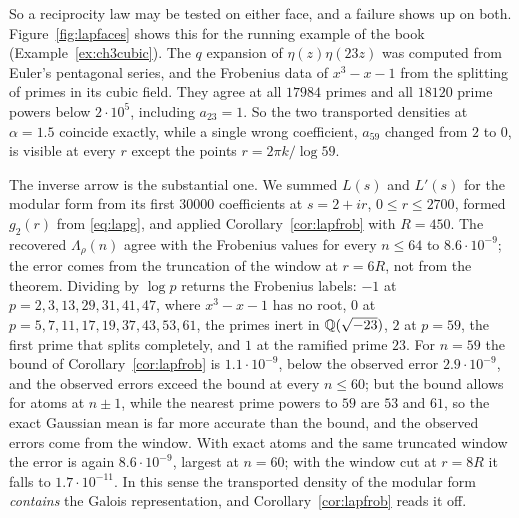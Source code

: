 So a reciprocity law may be tested on either face, and a failure shows up on both. Figure~\ref{fig:lapfaces} shows this for the running example of the book (Example~\ref{ex:ch3cubic}). The $q$ expansion of $\eta(z)\eta(23z)$ was computed from Euler's pentagonal series, and the Frobenius data of $x^3-x-1$ from the splitting of primes in its cubic field. They agree at all $17984$ primes and all $18120$ prime powers below $2\cdot10^5$, including $a_{23}=1$. So the two transported densities at $\alpha=1.5$ coincide exactly, while a single wrong coefficient, $a_{59}$ changed from $2$ to $0$, is visible at every $r$ except the points $r=2\pi k/\log59$.

The inverse arrow is the substantial one. We summed $L(s)$ and $L'(s)$ for the modular form from its first $30000$ coefficients at $s=2+ir$, $0\le r\le2700$, formed $g_2(r)$ from \eqref{eq:lapg}, and applied Corollary~\ref{cor:lapfrob} with $R=450$. The recovered $\Lambda_\rho(n)$ agree with the Frobenius values for every $n\le64$ to $8.6\cdot10^{-9}$; the error comes from the truncation of the window at $r=6R$, not from the theorem. Dividing by $\log p$ returns the Frobenius labels: $-1$ at $p=2,3,13,29,31,41,47$, where $x^3-x-1$ has no root, $0$ at $p=5,7,11,17,19,37,43,53,61$, the primes inert in $\mathbb{Q}(\sqrt{-23})$, $2$ at $p=59$, the first prime that splits completely, and $1$ at the ramified prime $23$. For $n=59$ the bound of Corollary~\ref{cor:lapfrob} is $1.1\cdot10^{-9}$, below the observed error $2.9\cdot10^{-9}$, and the observed errors exceed the bound at every $n\le60$; but the bound allows for atoms at $n\pm1$, while the nearest prime powers to $59$ are $53$ and $61$, so the exact Gaussian mean is far more accurate than the bound, and the observed errors come from the window. With exact atoms and the same truncated window the error is again $8.6\cdot10^{-9}$, largest at $n=60$; with the window cut at $r=8R$ it falls to $1.7\cdot10^{-11}$. In this sense the transported density of the modular form \emph{contains} the Galois representation, and Corollary~\ref{cor:lapfrob} reads it off.

